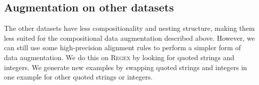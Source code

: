 \documentclass[11pt,letterpaper]{article}
\newcommand{\atis}{\textsc{ATIS}\xspace}
\newcommand{\regex}{\textsc{Regex}\xspace}
\newcommand{\catroot}{\textsc{Root}\xspace}
\newcommand{\catquotstr}{\textsc{Str}\xspace}
\newcommand{\catint}{\textsc{Int}\xspace}
\newcommand\pl[1]{}
\newcommand\rj[1]{}
\begin{document}
\subsection{Augmentation on other datasets}
%
%
%
%
%
%
%
%
%
%
%
The other datasets have
less compositionality and nesting structure,
making them less suited for the compositional data augmentation
described above.
However, we can still use some high-precision alignment rules
to perform a simpler form of data augmentation.
We do this on \regex by looking for quoted strings and integers.
We generate new examples by
swapping quoted strings and integers in one example
for other quoted strings or integers.
\end{document}
